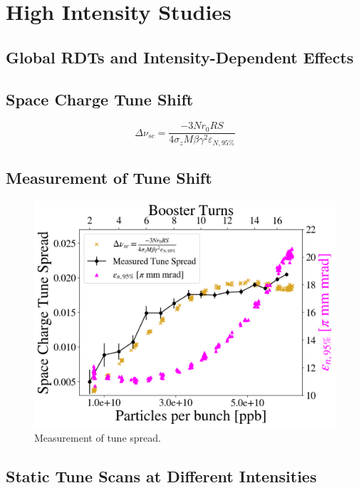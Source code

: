 \chapter{High Intensity Studies}
\label{sec:ch6}

\section{Global RDTs and Intensity-Dependent Effects}
\cite{mionrr}
\section{Space Charge Tune Shift}

\begin{equation}
    \Delta \nu_{sc}=\frac{-3 N r_0 R S}{4 \sigma_z M \beta \gamma ^2 \varepsilon_{N,95\%}}    
\end{equation}

\section{Measurement of Tune Shift}

\begin{figure}[H]
    \centering
    \includegraphics[width=\columnwidth]{chapter6/tune_spread.png}
    \caption{Measurement of tune spread.}
    \label{fig:tunespread}
\end{figure}

\section{Static Tune Scans at Different Intensities}
